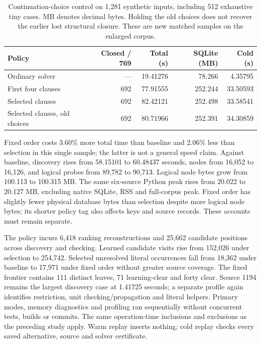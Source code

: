 \documentclass[11pt,a4paper]{article}
\numberwithin{equation}{section}
\theoremstyle{plain}
\theoremstyle{definition}
\theoremstyle{remark}
\begin{document}
\begin{table}[htbp]
\centering
\small
\begin{tabular}{lrrrr}
\hline
Policy & Closed / 769 & Total (s) & SQLite (MB) & Cold (s) \\
\hline
Ordinary solver & --- & 19.41276 & 78.266 & 4.35795 \\
First four clauses & 692 & 77.91555 & 252.244 & 33.50593 \\
Selected clauses & 692 & 82.42121 & 252.498 & 33.58541 \\
Selected clauses, old choices & 692 & 80.71966 & 252.391 & 34.30859 \\
\hline
\end{tabular}
\caption{Continuation-choice control on 1,281 synthetic inputs, including 512 exhaustive tiny cases. MB denotes decimal bytes. Holding the old choices does not recover the earlier lost structural closure. These are new matched samples on the enlarged corpus.}
\label{tab:learning-fixed-order}
\end{table}

Fixed order costs 3.60\% more total time than baseline and 2.06\% less than selection in this single sample; the latter is not a general speed claim. Against baseline, discovery rises from 58.15101 to 60.48437 seconds, nodes from 16,052 to 16,126, and logical probes from 89,782 to 90,713. Logical node bytes grow from 100.113 to 100.315 MB. The same six-source Python peak rises from 20.022 to 20.127 MB, excluding native SQLite, RSS and full-corpus peak. Fixed order has slightly fewer physical database bytes than selection despite more logical node bytes; its shorter policy tag also affects keys and source records. These accounts must remain separate.

The policy incurs 6,418 ranking reconstructions and 25,662 candidate positions across discovery and checking. Learned candidate visits rise from 152,026 under selection to 254,742. Selected unresolved literal occurrences fall from 18,362 under baseline to 17,971 under fixed order without greater source coverage. The fixed frontier contains 111 distinct leaves, 71 learning-clear and forty clear. Source 1194 remains the largest discovery case at 1.41725 seconds; a separate profile again identifies restriction, unit checking/propagation and literal helpers. Primary modes, memory diagnostics and profiling ran sequentially without concurrent tests, builds or commits. The same operation-time inclusions and exclusions as the preceding study apply. Warm replay inserts nothing; cold replay checks every saved alternative, source and solver certificate.
\end{document}
